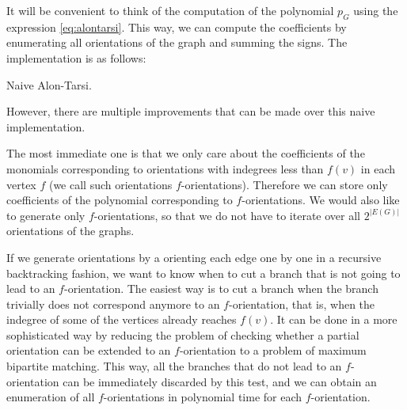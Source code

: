 It will be convenient to think of the computation of the polynomial $p_G$ using the expression \eqref{eq:alontarsi}. This way, we can compute the 
coefficients by enumerating all orientations of the graph and summing the signs.  The implementation is as follows:

\begin{algorithm}[H]
\caption{Naive Alon-Tarsi.}
\SetAlgoLined
{}
\end{algorithm}

However, there are multiple improvements that can be made over this naive implementation.

The most immediate one is that we only care about the coefficients of the monomials
corresponding to orientations with indegrees less than $f(v)$ in each vertex $f$ 
(we call such orientations $f$-orientations).
Therefore we can store only coefficients of the polynomial corresponding to $f$-orientations.
We would also like to generate only $f$-orientations, so that we do not have to iterate over all 
$2^|E(G)|$ orientations of the graphs. 

If we generate orientations by a orienting each edge one by
one in a recursive backtracking fashion, we want to know when to cut a branch that is not going to lead
to an $f$-orientation. The easiest way is to cut a branch when the branch trivially does not correspond
anymore to an $f$-orientation, that is, when the indegree of some of the vertices already reaches $f(v)$. 
It can be done in a more sophisticated way by reducing the problem of checking whether a partial 
orientation can be extended to an $f$-orientation to a problem of maximum bipartite matching. This way,
all the branches that do not lead to an $f$-orientation can be immediately discarded by this test, and 
we can obtain an enumeration of all $f$-orientations in polynomial time for each $f$-orientation.

